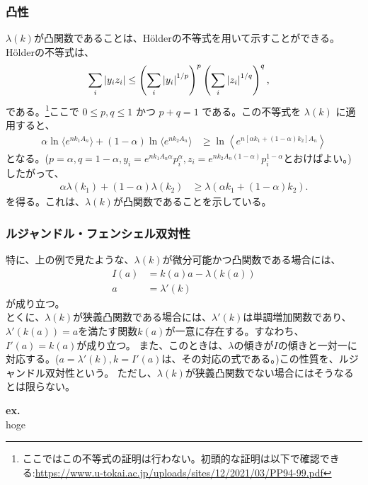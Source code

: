 \documentclass[a4paper,11pt]{jsarticle}
\numberwithin{equation}{section}
\begin{document}
\subsubsection{凸性}
$\lambda(k)$が凸関数であることは、H\"{o}lderの不等式を用いて示すことができる。H\"{o}lderの不等式は、
\begin{align}
  \sum_i \abs{y_i z_i} &\leq \left( \sum_i \abs{y_i}^{1/p} \right)^{p} \left( \sum_i \abs{z_i}^{1/q} \right)^{q},
\end{align}
である。\footnote{ここではこの不等式の証明は行わない。初頭的な証明は以下で確認できる:\url{https://www.u-tokai.ac.jp/uploads/sites/12/2021/03/PP94-99.pdf}}ここで \(0 \leq p, q \leq 1\) かつ \(p + q = 1\) である。この不等式を \(\lambda(k)\) に適用すると、
\begin{align}
  \alpha \ln \langle e^{n k_1 A_n} \rangle + (1 - \alpha) \ln \langle e^{n k_2 A_n} \rangle &\geq \ln \left\langle e^{n [\alpha k_1 + (1 - \alpha) k_2] A_n} \right\rangle
\end{align}
となる。($p = \alpha, q = 1 - \alpha,y_i = e^{n k_1 A_n\alpha} p_i^{\alpha},z_i = e^{n k_2 A_n(1 - \alpha)} p_i^{1 - \alpha}$とおけばよい。)\\
したがって、
\begin{align}
  \alpha \lambda(k_1) + (1 - \alpha) \lambda(k_2) &\geq \lambda(\alpha k_1 + (1 - \alpha) k_2).
\end{align}
を得る。これは、\(\lambda(k)\)が凸関数であることを示している。

\subsubsection{ルジャンドル・フェンシェル双対性}
特に、上の例で見たような、$\lambda(k)$が微分可能かつ凸関数である場合には、
\begin{align}
    I(a) &= k(a) a - \lambda(k(a))\\
    a &= \lambda'(k)
\end{align}
が成り立つ。\\
とくに、$\lambda(k)$が狭義凸関数である場合には、$\lambda'(k)$は単調増加関数であり、$\lambda'(k(a)) = a$を満たす関数$k(a)$が一意に存在する。すなわち、$I'(a) = k(a)$が成り立つ。
また、このときは、$\lambda$の傾きが$I$の傾きと一対一に対応する。($a = \lambda '(k),k = I'(a)$は、その対応の式である。)この性質を、ルジャンドル双対性という。
ただし、$\lambda(k)$が狭義凸関数でない場合にはそうなるとは限らない。

\textbf{ex.}\\
hoge
\end{document}
